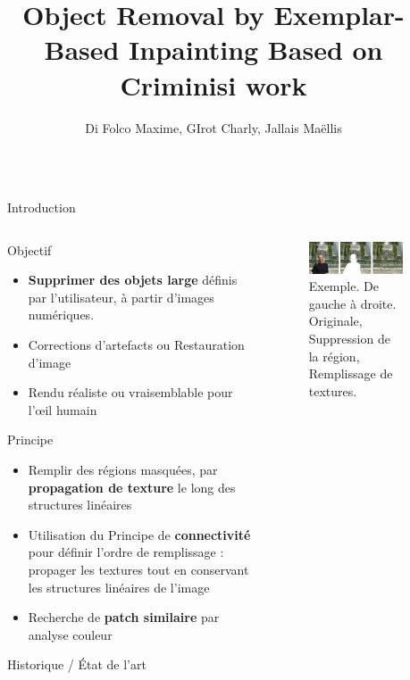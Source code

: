 \documentclass[final,hyperref={pdfpagelabels=false}]{beamer}
\title{\huge  Object Removal by Exemplar-Based Inpainting \small Based on Criminisi work}
\author{Di Folco Maxime, GIrot Charly, Jallais Maëllis}
\institute{Ecole Supérieure de Chimie Physique Électronique de Lyon}
\begin{document}
\begin{frame}[t]

\begin{columns}[t]
\begin{column}{.02\textwidth} \end{column}
\begin{column}{.930\textwidth} 
\begin{block}{\Large Introduction}
\begin{columns}[t]
\begin{column}{.496\textwidth}
Objectif
\begin{itemize} 
\item \textbf{Supprimer des objets large} définis par l'utilisateur, à partir d'images numériques. 
\item Corrections d'artefacts ou Restauration d'image
\item Rendu réaliste ou vraisemblable pour l'œil humain
\end{itemize}
Principe
\begin{itemize} 
\item Remplir des régions masquées, par \textbf{propagation de texture} le long des structures linéaires 
\item Utilisation du Principe de \textbf{connectivité} pour définir l'ordre de remplissage : propager les textures tout en conservant les structures linéaires de l'image
\item Recherche de \textbf{patch similaire} par analyse couleur
\end{itemize}

Historique / État de l'art 

 


\end{column}
\begin{column}{.496\textwidth}
\begin{figure}[!b]
\includegraphics[width=0.8\linewidth]{inpaintingex.jpeg}
\caption{Exemple. De gauche à droite. Originale, Suppression de la région, Remplissage de textures. }
\label{example}
\end{figure}
\end{column}
\end{columns}
\end{block}
\end{column}



\end{columns}
\end{frame}
\end{document}
